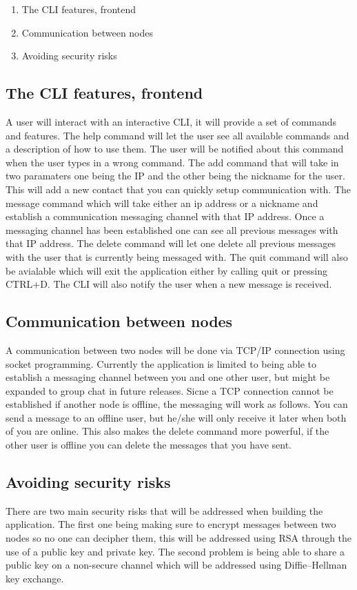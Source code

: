 \documentclass[twoside]{article}
\begin{document}
\begin{multicols}{2}
\begin{enumerate}
  \item The CLI features, frontend
  \item Communication between nodes 
  \item Avoiding security risks 
\end{enumerate}


\subsection{The CLI features, frontend}
A user will interact with an interactive CLI, it will provide a set of commands and features. The help command will let the user see all available commands and a description of how to use them. The user 
will be notified about this command when the user types in a wrong command. The add command that will take in two paramaters one being the IP and the other 
being the nickname for the user. This will add a new contact that you can quickly setup communication with. The message command which will take either an ip address or a nickname and establish a communication messaging channel with that IP address. Once a messaging channel has been established one can see all previous messages with that IP address. The delete command will let one delete all previous messages with the user that is currently being messaged with. The quit command will also be avialable which will exit the application either 
by calling quit or pressing CTRL+D. The CLI will also notify the user when a new message is received.
\subsection{Communication between nodes }
A communication between two nodes will be done via TCP/IP connection using socket programming. Currently the application is limited to being able to establish a messaging channel between you and one other user, but might be expanded to group chat in future releases. Sicne a TCP connection cannot be established if another node is offline, the messaging will work as follows. You can send a message to an offline user, but he/she will only receive it later when both of you are online. This also makes the delete command more powerful, if the other user is offline you can delete the messages that you have sent.
\subsection{Avoiding security risks}
There are two main security risks that will be addressed when building the application. The first one being making sure to encrypt messages between two nodes so no one can decipher them, this will be addressed using RSA through the use of a public key and private key. The second problem is being able to share a public key on a non-secure channel which will be addressed using Diffie–Hellman key exchange.

\end{multicols}
\end{document}
